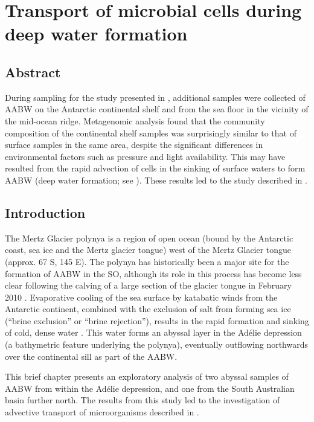 \chapter[Deep water formation]{Transport of microbial cells during deep water formation}
\label{ch:deepwaterformation}

\section{Abstract}

During sampling for the study presented in , additional samples were collected of \ac{AABW} on the Antarctic continental shelf and from the sea floor in the vicinity of the mid-ocean ridge.
Metagenomic analysis found that the community composition of the continental shelf samples was surprisingly similar to that of surface samples in the same area, despite the significant differences in environmental factors such as pressure and light availability.
This may have resulted from the rapid advection of cells in the sinking of surface waters to form \ac{AABW} (deep water formation; see ).
These results led to the study described in .

\glsresetall

\section{Introduction}

The Mertz Glacier polynya is a region of open ocean (bound by the Antarctic coast, sea ice and the Mertz glacier tongue) west of the Mertz Glacier tongue (approx. 67\textdegree{} S, 145\textdegree{} E).
The polynya has historically been a major site for the formation of \ac{AABW} in the \ac{SO}, although its role in this process has become less clear following the calving of a large section of the glacier tongue in February 2010 \cite{Tamura:2012da}.
Evaporative cooling of the sea surface by katabatic winds from the Antarctic continent, combined with the exclusion of salt from forming sea ice (``brine exclusion'' or ``brine rejection''), results in the rapid formation and sinking of cold, dense water \cite{Williams:2008iu}.
This water forms an abyssal layer in the Ad\'{e}lie depression (a bathymetric feature underlying the polynya), eventually outflowing northwards over the continental sill as part of the \ac{AABW}.

This brief chapter presents an exploratory analysis of two abyssal samples of \ac{AABW} from within the Ad\'{e}lie depression, and one from the South Australian basin further north.
The results from this study led to the investigation of advective transport of microorganisms described in .

